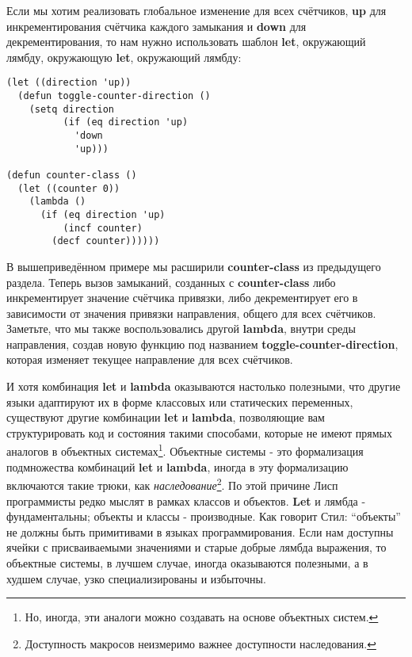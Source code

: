 Если мы хотим реализовать глобальное изменение для всех счётчиков, \textbf{up} для инкрементирования счётчика каждого замыкания и \textbf{down} для декрементирования, то нам нужно использовать шаблон \textbf{let}, окружающий лямбду, окружающую \textbf{let}, окружающий лямбду:

\begin{verbatim}
(let ((direction 'up))
  (defun toggle-counter-direction ()
    (setq direction
          (if (eq direction 'up)
            'down
            'up)))

(defun counter-class ()
  (let ((counter 0))
    (lambda ()
      (if (eq direction 'up)
          (incf counter)
        (decf counter))))))
\end{verbatim}

В вышеприведённом примере мы расширили \textbf{counter-class} из предыдущего раздела. Теперь вызов замыканий, созданных с \textbf{counter-class} либо инкрементирует значение счётчика привязки, либо декрементирует его в зависимости от значения привязки направления, общего для всех счётчиков. Заметьте, что мы также воспользовались другой \textbf{lambda}, внутри среды направления, создав новую функцию под названием {\textbf{tog\-gle-coun\-ter-di\-rec\-tion}}, которая изменяет текущее направление для всех счётчиков.

И хотя комбинация \textbf{let} и \textbf{lambda} оказываются настолько полезными, что другие языки адаптируют их в форме классовых или статических переменных, существуют другие комбинации \textbf{let} и \textbf{lambda}, позволяющие вам структурировать код и состояния такими способами, которые не имеют прямых аналогов в объектных системах\footnote{Но, иногда, эти аналоги можно создавать на основе объектных систем.}. Объектные системы - это формализация подмножества комбинаций \textbf{let} и \textbf{lambda}, иногда в эту формализацию включаются такие трюки, как \emph{наследование}\footnote{Доступность макросов неизмеримо важнее доступности наследования.}. По этой причине Лисп программисты редко мыслят в рамках классов и объектов. \textbf{Let} и лямбда - фундаментальны; объекты и классы - производные. Как говорит Стил: ``объекты'' не должны быть примитивами в языках программирования. Если нам доступны ячейки с присваиваемыми значениями и старые добрые лямбда выражения, то объектные системы, в лучшем случае, иногда оказываются полезными, а в худшем случае, узко специализированы и избыточны.

